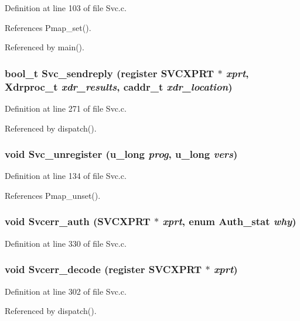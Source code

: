 Definition at line 103 of file Svc.c.

References Pmap\_\-set().

Referenced by main().
\subsubsection{\setlength{\rightskip}{0pt plus 5cm}bool\_\-t Svc\_\-sendreply (register SVCXPRT $\ast$ {\em xprt}, Xdrproc\_\-t {\em xdr\_\-results}, caddr\_\-t {\em xdr\_\-location})}\label{Svc_8c_a14}




Definition at line 271 of file Svc.c.

Referenced by dispatch().
\subsubsection{\setlength{\rightskip}{0pt plus 5cm}void Svc\_\-unregister (u\_\-long {\em prog}, u\_\-long {\em vers})}\label{Svc_8c_a11}




Definition at line 134 of file Svc.c.

References Pmap\_\-unset().
\subsubsection{\setlength{\rightskip}{0pt plus 5cm}void Svcerr\_\-auth (SVCXPRT $\ast$ {\em xprt}, enum Auth\_\-stat {\em why})}\label{Svc_8c_a18}




Definition at line 330 of file Svc.c.
\subsubsection{\setlength{\rightskip}{0pt plus 5cm}void Svcerr\_\-decode (register SVCXPRT $\ast$ {\em xprt})}\label{Svc_8c_a16}




Definition at line 302 of file Svc.c.

Referenced by dispatch().
